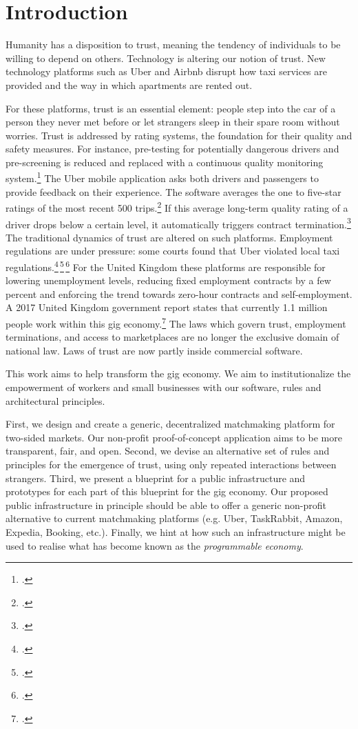 \documentclass[USenglish]{article}
\begin{document}
\maketitle

\section{Introduction}
Humanity has a disposition to trust, meaning the tendency of individuals to be willing to depend on others.
Technology is altering our notion of trust.
New technology platforms such as Uber and Airbnb disrupt how taxi services are provided and the way in which apartments are rented out.

For these platforms, trust is an essential element: people step into the car of a person they never met before or let strangers sleep in their spare room without worries.
Trust is addressed by rating systems, the foundation for their quality and safety measures.
For instance, pre-testing for potentially dangerous drivers and pre-screening is reduced and replaced with a continuous quality monitoring system.\footcite{uberfivestar}
The Uber mobile application asks both drivers and passengers to provide feedback on their experience.
The software averages the one to five-star ratings of the most recent 500 trips.\footcite{uberratinghelp}
If this average long-term quality rating of a driver drops below a certain level, it automatically triggers contract termination.\footcite{forbesuserfiring}
The traditional dynamics of trust are altered on such platforms.
Employment regulations are under pressure: some courts found that Uber violated local taxi regulations.\footcite{ftuberregulation}\,\footcite{reutersuberdanish}\,\footcite{reutersubersouthkorea}
For the United Kingdom these platforms are responsible for lowering unemployment levels, reducing fixed employment contracts by a few percent and enforcing the trend towards zero-hour contracts and self-employment.
A 2017 United Kingdom government report states that currently 1.1 million people work within this gig economy.\footcite{goodgigs}
The laws which govern trust, employment terminations, and access to marketplaces are no longer the exclusive domain of national law.
Laws of trust are now partly inside commercial software.

This work aims to help transform the gig economy.
We aim to institutionalize the empowerment of workers and small businesses with our software, rules and architectural principles.

First, we design and create a generic, decentralized matchmaking platform for two-sided markets.
Our non-profit proof-of-concept application aims to be more transparent, fair, and open.
Second, we devise an alternative set of rules and principles for the emergence of trust, using only repeated interactions between strangers.
Third, we present a blueprint for a public infrastructure and prototypes for each part of this blueprint for the gig economy.
Our proposed public infrastructure in principle should be able to offer a generic non-profit alternative to current matchmaking platforms (e.g. Uber, TaskRabbit, Amazon, Expedia, Booking, etc.).
Finally, we hint at how such an infrastructure might be used to realise what has become known as the \emph{programmable economy}.
\end{document}
